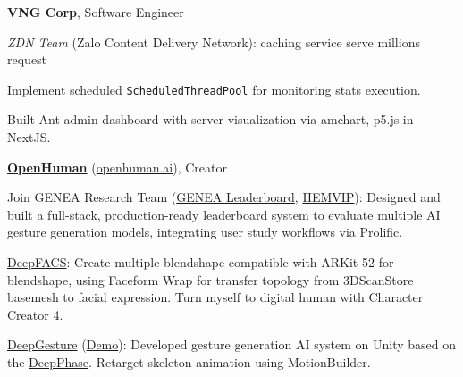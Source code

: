 \cvspace

\begin{twocolentry}{
	}
	\textbf{VNG Corp}, Software Engineer
	
	\textit{ZDN Team} (Zalo Content Delivery Network): caching service serve millions request
	\begin{highlights}
		\item Implement scheduled \texttt{ScheduledThreadPool} for monitoring stats execution.
		\item Built Ant admin dashboard with server visualization via amchart, p5.js in NextJS.
	\end{highlights}
\end{twocolentry}

\begin{twocolentry}{
	}
	\href{https://www.linkedin.com/company/openhuman/}{\textbf{OpenHuman}} (\href{https://openhuman.ai}{openhuman.ai}), Creator
	
	\begin{highlights}
		\item Join GENEA Research Team (\href{https://genealeaderboard.github.io}{GENEA Leaderboard}, \href{https://github.com/hemvip/hemvip.github.io}{HEMVIP}): Designed and built a full-stack, production-ready leaderboard system to evaluate multiple AI gesture generation models, integrating user study workflows via Prolific.
		
		
		
		\item  \href{https://github.com/DeepFACS}{DeepFACS}: Create multiple blendshape compatible with ARKit 52 for blendshape, using Faceform Wrap for transfer topology from 3DScanStore basemesh to facial expression. Turn myself to digital human with Character Creator 4.
		
	
		
		\item \href{https://github.com/DeepGesture/DeepGesture-Unity}{DeepGesture} (\href{https://www.youtube.com/watch?v=eZghfNGmZn8}{Demo}): Developed gesture generation AI system on Unity based on the \href{https://www.youtube.com/watch?v=YhH4PYEkVnY}{DeepPhase}. Retarget skeleton animation using MotionBuilder.
		
	\end{highlights}
	
\end{twocolentry}

